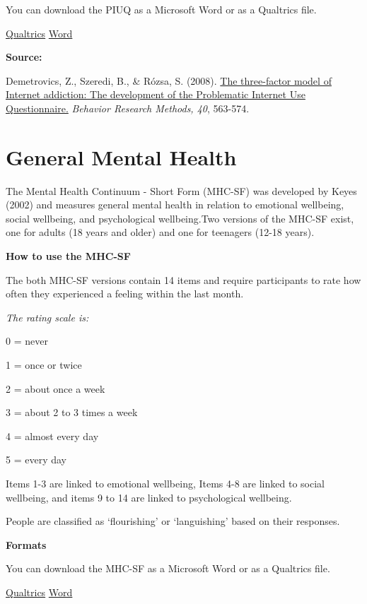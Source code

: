 \documentclass[
]{book}
\begin{document}
You can download the PIUQ as a Microsoft Word or as a Qualtrics file.

\href{questionnaires/ProblematicInternetUseQuestionnaire.qsf}{Qualtrics} \textbar{}
\href{questionnaires/ProblematicInternetUseQuestionnaire.docx}{Word}

\textbf{Source:}

Demetrovics, Z., Szeredi, B., \& Rózsa, S. (2008). \href{https://link.springer.com/content/pdf/10.3758/BRM.40.2.563}{The three-factor model of Internet addiction: The development of the Problematic Internet Use Questionnaire.} \emph{Behavior Research Methods, 40}, 563-574.

\hypertarget{general-mental-health}{%
\section{General Mental Health}\label{general-mental-health}}

The Mental Health Continuum - Short Form (MHC-SF) was developed by Keyes (2002) and measures general mental health in relation to emotional wellbeing, social wellbeing, and psychological wellbeing.Two versions of the MHC-SF exist, one for adults (18 years and older) and one for teenagers (12-18 years).

\textbf{How to use the MHC-SF}

The both MHC-SF versions contain 14 items and require participants to rate how often they experienced a feeling within the last month.

\emph{The rating scale is:}

0 = never

1 = once or twice

2 = about once a week

3 = about 2 to 3 times a week

4 = almost every day

5 = every day

Items 1-3 are linked to emotional wellbeing, Items 4-8 are linked to social wellbeing, and items 9 to 14 are linked to psychological wellbeing.

People are classified as `flourishing' or `languishing' based on their responses.

\textbf{Formats}

You can download the MHC-SF as a Microsoft Word or as a Qualtrics file.

\href{questionnaires/MentalHealthContinuum_Adults.qsf}{Qualtrics} \textbar{}
\href{questionnaires/MentalHealthContinuum_Adults.docx}{Word}
\end{document}
